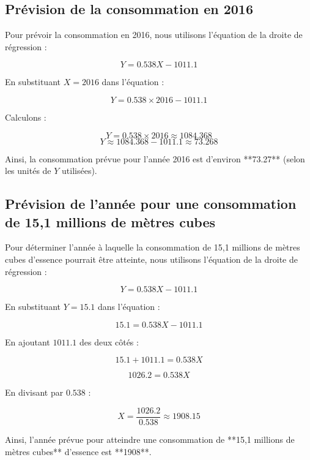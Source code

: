 \documentclass[12pt]{article}
\begin{document}
\subsection*{Prévision de la consommation en 2016}

Pour prévoir la consommation en 2016, nous utilisons l'équation de la droite de régression :

\[
Y = 0.538X - 1011.1
\]

En substituant \(X = 2016\) dans l'équation :

\[
Y = 0.538 \times 2016 - 1011.1
\]

Calculons :

\[
Y = 0.538 \times 2016 \approx 1084.368
\]
\[
Y \approx 1084.368 - 1011.1 \approx 73.268
\]

Ainsi, la consommation prévue pour l'année 2016 est d'environ **73.27** (selon les unités de \(Y\) utilisées).
\subsection*{Prévision de l'année pour une consommation de 15,1 millions de mètres cubes}

Pour déterminer l'année à laquelle la consommation de 15,1 millions de mètres cubes d'essence pourrait être atteinte, nous utilisons l'équation de la droite de régression :

\[
Y = 0.538X - 1011.1
\]

En substituant \(Y = 15.1\) dans l'équation :

\[
15.1 = 0.538X - 1011.1
\]

En ajoutant \(1011.1\) des deux côtés :

\[
15.1 + 1011.1 = 0.538X
\]

\[
1026.2 = 0.538X
\]

En divisant par \(0.538\) :

\[
X = \frac{1026.2}{0.538} \approx 1908.15
\]

Ainsi, l'année prévue pour atteindre une consommation de **15,1 millions de mètres cubes** d'essence est **1908**.
\end{document}
